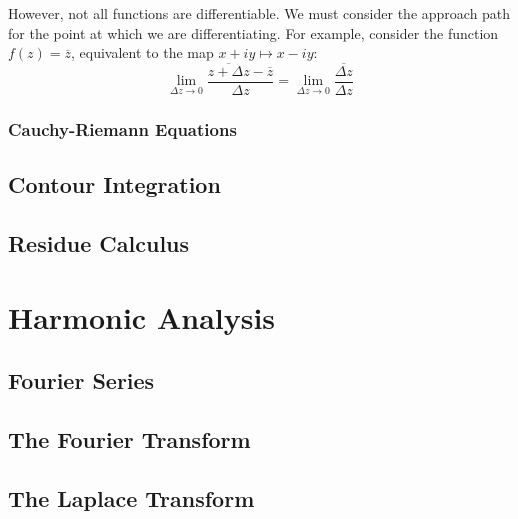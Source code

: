 \documentclass[10pt]{scrartcl}
\numberwithin{equation}{subsection}
\theoremstyle{definition}
\theoremstyle{remark}
\newcommand*{\conjugate}[1]{\overline{#1}}
\begin{document}
However, not all functions are differentiable. We must consider the approach
path for the point at which we are differentiating. For example, consider the
function $f(z) = \conjugate{z}$, equivalent to the map $x+iy \mapsto x-iy$:
\[
	\lim_{\Delta z \to 0} \frac{\conjugate{z + \Delta z} -
	\conjugate{z}}{\Delta z} = \lim_{\Delta z \to 0}
	\frac{\conjugate{\Delta z}}{\Delta z}
\]

\subsubsection{Cauchy-Riemann Equations}
\subsection{Contour Integration}
\subsection{Residue Calculus}
\section{Harmonic Analysis}
\label{HarmonicAnalysis}
\subsection{Fourier Series}
\subsection{The Fourier Transform}
\subsection{The Laplace Transform}
\end{document}
